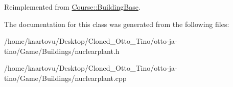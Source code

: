 Reimplemented from \hyperlink{class_course_1_1_building_base_ac2cc44e08dc73d05b1617bf71295baaf}{Course\-::\-Building\-Base}.



The documentation for this class was generated from the following files\-:\begin{DoxyCompactItemize}
\item 
/home/kaartovu/\-Desktop/\-Cloned\-\_\-\-Otto\-\_\-\-Tino/otto-\/ja-\/tino/\-Game/\-Buildings/nuclearplant.\-h\item 
/home/kaartovu/\-Desktop/\-Cloned\-\_\-\-Otto\-\_\-\-Tino/otto-\/ja-\/tino/\-Game/\-Buildings/nuclearplant.\-cpp\end{DoxyCompactItemize}

